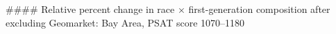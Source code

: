 #### Relative percent change in race × first-generation composition after excluding Geomarket: Bay Area, PSAT score 1070–1180
